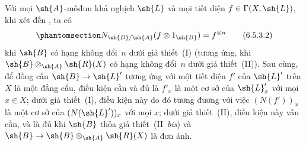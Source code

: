 \documentclass[oneside,10pt]{amsart}
\makeatletter
\newcommand{\ega@arrow}[2]{\mathchoice{#1}{#2}{#2}{#2}}
\renewcommand{\to}{\ega@arrow{\longrightarrow}{\rightarrow}}
\let\EGAOriginalLabel\label
\renewcommand{\label}[1]{\phantomsection\EGAOriginalLabel{#1}}
\makeatother
\begin{document}
\begin{env}[6.5.3]
Với mọi $\sh{A}$-môđun khả nghịch $\sh{L}$ và mọi tiết diện $f\in\Gamma(X,\sh{L})$, khi xét đến , ta có
\[
\label{II.6.5.3.2}
  N_{\sh{B}/\sh{A}}(f\otimes 1_{\sh{B}}) = f^{\otimes n}
\tag{6.5.3.2}
\]
khi $\sh{B}$ có hạng không đổi~$n$ dưới giả thiết~(I) (tương ứng, khi $\sh{B}\otimes_{\sh{A}}\sh{R}(X)$ có hạng không đổi~$n$ dưới giả thiết~(II)).
Sau cùng, để đồng cấu $\sh{B}\to\sh{L}'$ tương ứng với một tiết diện $f'$ của $\sh{L}'$ trên $X$ là một đẳng cấu, điều kiện cần và đủ là $f'_x$ là một cơ sở của $\sh{L}'_x$ với mọi $x\in X$;
dưới giả thiết~(I), điều kiện này do đó tương đương với việc $(N(f'))_x$ là một cơ sở của $(N(\sh{L}'))_x$ với mọi $x$;
dưới giả thiết~(II), điều kiện này vẫn cần, và là đủ khi $\sh{B}$ thỏa giả thiết~(II~\emph{bis}) và $\sh{B}\to\sh{B}\otimes_{\sh{A}}\sh{R}(X)$ là đơn ánh.
\end{env}
\end{document}

